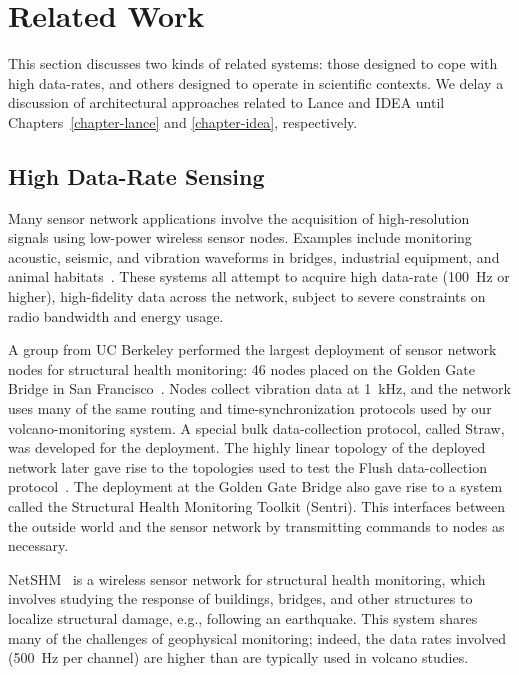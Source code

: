 \section{Related Work}
\label{sec-relatedwork}

This section discusses two kinds of related systems: those designed to cope
with high data-rates, and others designed to operate in scientific contexts.
We delay a discussion of architectural approaches related to Lance and IDEA
until Chapters~\ref{chapter-lance} and \ref{chapter-idea}, respectively.

\subsection{High Data-Rate Sensing}

Many sensor network applications involve the acquisition of high-resolution
signals using low-power wireless sensor nodes. Examples include monitoring
acoustic, seismic, and vibration waveforms in bridges, industrial equipment,
and animal habitats~\cite{girod-ipsn07,enviromic}. These systems all attempt
to acquire high data-rate (100~Hz or higher), high-fidelity data across the
network, subject to severe constraints on radio bandwidth and energy usage.

A group from UC Berkeley performed the largest deployment of sensor network
nodes for structural health monitoring: 46 nodes placed on the Golden Gate
Bridge in San Francisco~\cite{ggb-ipsn07}. Nodes collect vibration data at
1~kHz, and the network uses many of the same routing and time-synchronization
protocols used by our volcano-monitoring system. A special bulk
data-collection protocol, called Straw, was developed for the deployment. The
highly linear topology of the deployed network later gave rise to the
topologies used to test the Flush data-collection
protocol~\cite{flush-sensys07}. The deployment at the Golden Gate Bridge also
gave rise to a system called the Structural Health Monitoring Toolkit
(Sentri). This interfaces between the outside world and the sensor network by
transmitting commands to nodes as necessary.

NetSHM~\cite{netshm-ewsnsubmission,netshm-emnets05,wisan} is a wireless
sensor network for structural health monitoring, which involves studying the
response of buildings, bridges, and other structures to localize structural
damage, e.g., following an earthquake. This system shares many of the
challenges of geophysical monitoring; indeed, the data rates involved (500~Hz
per channel) are higher than are typically used in volcano studies. 

